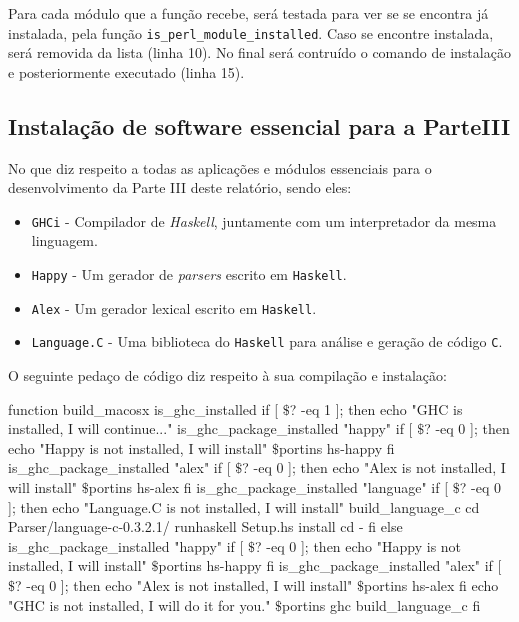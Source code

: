 Para cada módulo que a função recebe, será testada para ver se se encontra já instalada, pela função \texttt{is\_perl\_module\_installed}. Caso se encontre instalada, será removida da
lista (linha 10). No final será contruído o comando de instalação e posteriormente executado (linha 15).

\subsection{Instalação de software essencial para a ParteIII}\label{subsec parteiii}

No que diz respeito a todas as aplicações e módulos essenciais para o desenvolvimento da Parte III deste relatório, sendo eles:

\begin{itemize}
 \item \texttt{GHCi} - Compilador de \emph{Haskell}, juntamente com um interpretador da mesma linguagem.
 \item \texttt{Happy} - Um gerador de \emph{parsers} escrito em \texttt{Haskell}.
 \item \texttt{Alex} - Um gerador lexical escrito em \texttt{Haskell}.
 \item \texttt{Language.C} - Uma biblioteca do \texttt{Haskell} para análise e geração de código \texttt{C}.
\end{itemize}

O seguinte pedaço de código diz respeito à sua compilação e instalação:\\

\begin{myxml}
function build_macosx {
        is_ghc_installed
        if [ $\$$? -eq 1 ]; then
                echo "GHC is installed, I will continue..."
                is_ghc_package_installed "happy"
                if [ $\$$? -eq 0 ]; then
                        echo "Happy is not installed, I will install"
                        $\$$portins hs-happy
                fi
                is_ghc_package_installed "alex"
                if [ $\$$? -eq 0 ]; then
                        echo "Alex is not installed, I will install"
                        $\$$portins hs-alex
                fi
                is_ghc_package_installed "language"
                if [ $\$$? -eq 0 ]; then
                        echo "Language.C is not installed, I will install"
                        build_language_c
                        cd Parser/language-c-0.3.2.1/
                        runhaskell Setup.hs install
                        cd -
                fi
        else
                is_ghc_package_installed "happy"
                if [ $\$$? -eq 0 ]; then
                        echo "Happy is not installed, I will install"
                        $\$$portins hs-happy
                fi
                is_ghc_package_installed "alex"
                if [ $\$$? -eq 0 ]; then
                        echo "Alex is not installed, I will install"
                        $\$$portins hs-alex
                fi
                echo "GHC is not installed, I will do it for you."
                $\$$portins ghc
                build_language_c
        fi
}
\end{myxml}

